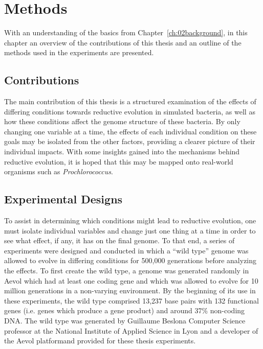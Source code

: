 \chapter{Methods}\label{ch:03methods}

With an understanding of the basics from Chapter~\ref{ch:02background}, in this chapter an overview of the contributions of this thesis and an outline of the methods used in the experiments are presented. 

\section{Contributions}
The main contribution of this thesis is a structured examination of the effects of differing conditions towards reductive evolution in simulated bacteria, as well as how these conditions affect the genome structure of these bacteria. By only changing one variable at a time, the effects of each individual condition on these goals may be isolated from the other factors, providing a clearer picture of their individual impacts. With some insights gained into the mechanisms behind reductive evolution, it is hoped that this may be mapped onto real-world organisms such as \textit{Prochlorococcus}. 

\section{Experimental Designs} \label{experimental_design}

To assist in determining which conditions might lead to reductive evolution, one must isolate individual variables and change just one thing at a time in order to see what effect, if any, it has on the final genome. To that end, a series of experiments were designed and conducted in which a ``wild type'' genome was allowed to evolve in differing conditions for 500,000 generations before analyzing the effects. To first create the wild type, a genome was generated randomly in Aevol which had at least one coding gene and which was allowed to evolve for 10 million generations in a non-varying environment. By the beginning of its use in these experiments, the wild type comprised 13,237 base pairs with 132 functional genes (i.e. genes which produce a gene product) and around 37\% non-coding DNA. The wild type was generated by Guillaume Beslon\textemdash a Computer Science professor at the National Institute of Applied Science in Lyon and a developer of the Aevol platform\textemdash and provided for these thesis experiments. 

